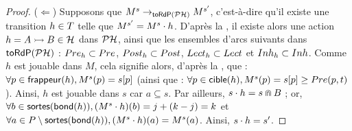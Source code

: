 \begin{proof}
  ($\Leftarrow$) Supposons que $M^s \rightarrow_{\mathsf{toRdP}(\mathcal{PH})} M^{s'}$,
    c'est-à-dire qu'il existe une transition $h \in T$ telle que $M^{s'} = M^s \cdot h$.
    D'après la , il existe alors
    une action $h = \mbox{$A \rightarrowtail B$} \in \mathcal{H}$ dans $\mathcal{PH}$,
    ainsi que les ensembles d'arcs suivants dans $\mathsf{toRdP}(\mathcal{PH})$ :
    $Pre_h \subset Pre$, $Post_h \subset Post$,
    $Lect_h \subset Lect$ et $Inh_h \subset Inh$.
    Comme $h$ est jouable dans $M$, cela signifie alors, d'après la , que :
    $\forall p \in \mathsf{frappeur}(h), M^s(p) = {s[p]}$
    (ainsi que : $\forall p \in \mathsf{cible}(h), M^s(p) = {s[p]} \geq Pre(p, t)$).
    Ainsi, $h$ est jouable dans $s$ car $a \subseteq s$.
    Par ailleurs, $s \cdot h = s \Cap B$ ;
    or, $\forall b \in \mathsf{sortes}(\mathsf{bond}(h)), (M^s \cdot h)(b) = j + (k - j) = k$
    et $\forall a \in P \setminus \mathsf{sortes}(\mathsf{bond}(h)), (M^s \cdot h)(a) = M^s(a)$.
    Ainsi, $s \cdot h = s'$.
\end{proof}



